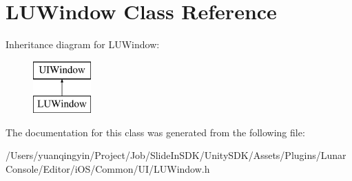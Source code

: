 \hypertarget{interface_l_u_window}{}\section{L\+U\+Window Class Reference}
\label{interface_l_u_window}
Inheritance diagram for L\+U\+Window\+:\begin{figure}[H]
\begin{center}
\leavevmode
\includegraphics[height=2.000000cm]{interface_l_u_window}
\end{center}
\end{figure}


The documentation for this class was generated from the following file\+:\begin{DoxyCompactItemize}
\item 
/\+Users/yuanqingyin/\+Project/\+Job/\+Slide\+In\+S\+D\+K/\+Unity\+S\+D\+K/\+Assets/\+Plugins/\+Lunar\+Console/\+Editor/i\+O\+S/\+Common/\+U\+I/L\+U\+Window.\+h\end{DoxyCompactItemize}
